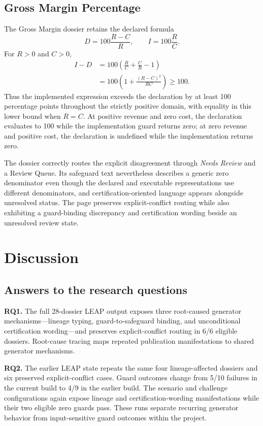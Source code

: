\documentclass[a4paper,fleqn]{cas-dc}
\begin{document}
\subsection{Gross Margin Percentage}
The Gross Margin dossier retains the declared formula
\[
D=100\frac{R-C}{R}, \qquad I=100\frac{R}{C}.
\]
For $R>0$ and $C>0$,
\[
\begin{aligned}
I-D &=100\left(\frac{R}{C}+\frac{C}{R}-1\right) \\
&=100\left(1+\frac{(R-C)^2}{RC}\right)\ge 100.
\end{aligned}
\]
Thus the implemented expression exceeds the declaration by at least 100 percentage points throughout the strictly positive domain, with equality in this lower bound when $R=C$. At positive revenue and zero cost, the declaration evaluates to 100 while the implementation guard returns zero; at zero revenue and positive cost, the declaration is undefined while the implementation returns zero.

The dossier correctly routes the explicit disagreement through \emph{Needs Review} and a Review Queue. Its safeguard text nevertheless describes a generic zero denominator even though the declared and executable representations use different denominators, and certification-oriented language appears alongside unresolved status. The page preserves explicit-conflict routing while also exhibiting a guard-binding discrepancy and certification wording beside an unresolved review state.

\section{Discussion}
\subsection{Answers to the research questions}
\textbf{RQ1.} The full 28-dossier LEAP output exposes three root-caused generator mechanisms---lineage typing, guard-to-safeguard binding, and unconditional certification wording---and preserves explicit-conflict routing in 6/6 eligible dossiers. Root-cause tracing maps repeated publication manifestations to shared generator mechanisms.

\textbf{RQ2.} The earlier LEAP state repeats the same four lineage-affected dossiers and six preserved explicit-conflict cases. Guard outcomes change from 5/10 failures in the current build to 4/9 in the earlier build. The scenario and challenge configurations again expose lineage and certification-wording manifestations while their two eligible zero guards pass. These runs separate recurring generator behavior from input-sensitive guard outcomes within the project.
\end{document}

